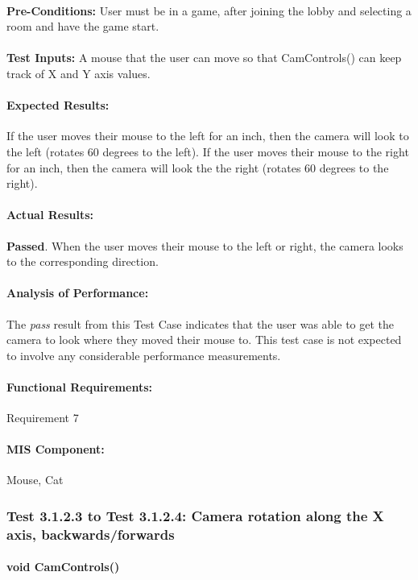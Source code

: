 \documentclass{article}
\begin{document}
    \paragraph{}\textbf{Pre-Conditions:} User must be in a game, after joining the lobby and selecting a room and have the game start.
    \paragraph{}\textbf{Test Inputs:} A mouse that the user can move so that CamControls() can keep track of X and Y axis values.
    \paragraph{Expected Results:} If the user moves their mouse to the left for an inch, then the camera will look to the left (rotates 60 degrees to the left). If the user moves their mouse to the right for an inch, then the camera will look the the right (rotates 60 degrees to the right).
    \paragraph{Actual Results:} \textbf{Passed}. When the user moves their mouse to the left or right, the camera looks to the corresponding direction. 
    \paragraph{Analysis of Performance:} The \emph{pass} result from this Test Case indicates that the user was able to get the camera to look where they moved their mouse to. This test case is not expected to involve any considerable performance measurements.
    \paragraph{Functional Requirements:} Requirement 7
    \paragraph{MIS Component:} Mouse, Cat 
    
    \subsubsection{Test 3.1.2.3 to Test 3.1.2.4: Camera rotation along the X axis, backwards/forwards}
    \paragraph{}\textbf{void CamControls()}
\end{document}
